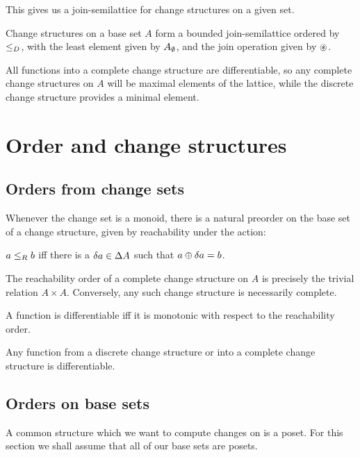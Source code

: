 This gives us a join-semilattice for change structures on a given set.

\begin{thm}
  Change structures on a base set $A$ form a bounded join-semilattice 
  ordered by $\leq_D$, with the least element given by
  $A_\emptyset$, and the join operation given by $\circledast$.
\end{thm}

All functions into a complete change structure are differentiable, so any
complete change structures on $A$ will be maximal elements of the lattice, while
the discrete change structure provides a minimal element.

\section{Order and change structures}
\label{sec:order}

\subsection{Orders from change sets}

Whenever the change set is a monoid, 
there is a natural preorder on the base set of a change structure, given by reachability
 under the action:
\begin{defn}
  $a \leq_R b$ iff there is a $\delta a \in \Delta A$ such that $a \oplus
  \delta a = b$.
\end{defn}

The reachability order of a complete change structure on $A$ is precisely the trivial relation
$A \times A$. Conversely, any such change structure is necessarily complete.

\begin{prop}
  A function is differentiable iff it is monotonic with respect to the
  reachability order.
\end{prop}

\begin{corollary}
  Any function from a discrete change structure or into a complete change
  structure is differentiable.
\end{corollary}

\subsection{Orders on base sets}

A common structure which we want to compute changes on is a poset. For this
section we shall assume that all of our base sets are posets.

